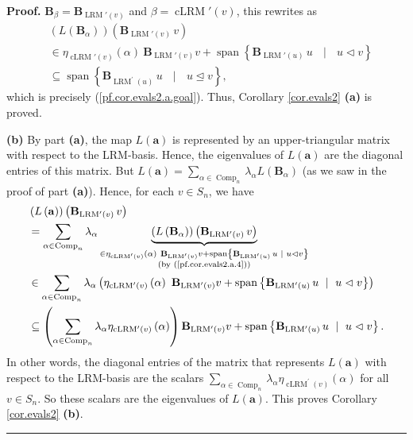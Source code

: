 \documentclass[submission]{FPSAC2026}
\newcommand{\cLRM}{\operatorname{cLRM}}
\newcommand{\LRM}{\operatorname{LRM}}
\newcommand{\tup}[1]{\left( #1 \right)}
\newenvironment{proof}[1][Proof]{\noindent\textbf{#1.} }{\ \rule{0.5em}{0.5em}}
\begin{document}
\begin{proof}
$\mathbf{B}_{\beta}=\mathbf{B}_{\LRM'(v)}$ and
$\beta=\cLRM'\left(  v\right)  $, this
rewrites as%
\begin{align}
& \left(  L\left(  \mathbf{B}_{\alpha}\right)  \right)  \left(  \mathbf{B}%
_{\LRM'(v)}\,v\right)  \nonumber\\
& \in\eta_{\cLRM'\left(  v\right)  }\left(
\alpha\right)  \ \mathbf{B}_{\LRM'(v)}%
v+\operatorname*{span}\left\{  \mathbf{B}_{\LRM'%
(u)}\,u\text{ }\mid\text{ }u\vartriangleleft v\right\}
\label{pf.cor.evals2.a.4}\\
& \subseteq\operatorname*{span}\left\{  \mathbf{B}_{\operatorname{LRM}%
^{\prime}(u)}\,u\text{ }\mid\text{ }u\trianglelefteq v\right\}  ,\nonumber
\end{align}
which is precisely (\ref{pf.cor.evals2.a.goal}). Thus, Corollary
\ref{cor.evals2} \textbf{(a)} is proved.
\medskip

\textbf{(b)} By part \textbf{(a)}, the map $L\left(  \mathbf{a}\right)  $ is
represented by an upper-triangular matrix with respect to the LRM-basis.
Hence, the eigenvalues of $L\left(  \mathbf{a}\right)  $ are the diagonal
entries of this matrix. But $L\left(  \mathbf{a}\right)  =\sum_{\alpha
\in\operatorname{Comp}_{n}}\lambda_{\alpha}L\left(  \mathbf{B}_{\alpha
}\right)  $ (as we saw in the proof of part \textbf{(a)}). Hence, for each
$v\in S_{n}$, we have%
\begin{align*}
& \left(  L\left(  \mathbf{a}\right)  \right)  \left(  \mathbf{B}%
_{\LRM'(v)}\,v\right)  \\
& =\sum_{\alpha\in\operatorname{Comp}_{n}}\lambda_{\alpha}\underbrace{\left(
L\left(  \mathbf{B}_{\alpha}\right)  \right)  \left(  \mathbf{B}%
_{\LRM'(v)}\,v\right)  }_{\substack{\in\eta
_{\cLRM'\left(  v\right)  }\tup{\alpha}\ \mathbf{B}%
_{\LRM'(v)}v+\operatorname*{span}\left\{  \mathbf{B}%
_{\LRM'(u)}\,u\text{ }\mid\text{ }u\vartriangleleft
v\right\}  \\\text{(by (\ref{pf.cor.evals2.a.4}))}}}\\
& \in\sum_{\alpha\in\operatorname{Comp}_{n}}\lambda_{\alpha}\left(
\eta_{\cLRM'\left(  v\right)  }\left(
\alpha\right)  \ \mathbf{B}_{\LRM'(v)}%
v+\operatorname*{span}\left\{  \mathbf{B}_{\LRM'%
(u)}\,u\text{ }\mid\text{ }u\vartriangleleft v\right\}  \right)  \\
& \subseteq\left(  \sum_{\alpha\in\operatorname{Comp}_{n}}
\lambda_{\alpha} \eta_{\cLRM'\left(  v\right)  }\tup{\alpha}\right)
\mathbf{B}_{\LRM'(v)}v+\operatorname*{span}\left\{
\mathbf{B}_{\LRM'(u)}\,u\text{ }\mid\text{
}u\vartriangleleft v\right\}  .
\end{align*}
In other words, the diagonal entries of the matrix that represents $L\left(
\mathbf{a}\right)  $ with respect to the LRM-basis are the scalars
$\sum_{\alpha\in\operatorname{Comp}_{n}}\lambda_{\alpha}\eta
_{\operatorname{cLRM}^{\prime}(v)}\left(  \alpha\right)  $ for all $v\in
S_{n}$. So these scalars are the eigenvalues of $L\left(  \mathbf{a}\right)
$. This proves Corollary \ref{cor.evals2} \textbf{(b)}.
\end{proof}
\end{document}
